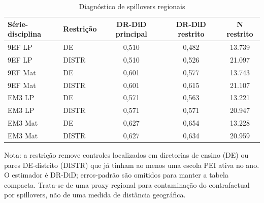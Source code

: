 \begin{table}[htbp]
\centering
\caption{Diagnóstico de spillovers regionais}
\label{tab:spillover_regional}
\begin{tabular}{llccc}
\toprule
Série-disciplina & Restrição & DR-DiD principal & DR-DiD restrito & N restrito \\
\midrule
9EF LP & DE & 0,510 & 0,482 & 13.739 \\
9EF LP & DISTR & 0,510 & 0,526 & 21.097 \\
9EF Mat & DE & 0,601 & 0,577 & 13.743 \\
9EF Mat & DISTR & 0,601 & 0,615 & 21.107 \\
EM3 LP & DE & 0,571 & 0,563 & 13.221 \\
EM3 LP & DISTR & 0,571 & 0,571 & 20.947 \\
EM3 Mat & DE & 0,627 & 0,654 & 13.228 \\
EM3 Mat & DISTR & 0,627 & 0,634 & 20.959 \\
\bottomrule
\end{tabular}
\vspace{0.2cm}
\begin{flushleft}
\footnotesize Nota: a restrição remove controles localizados em diretorias de ensino (DE) ou pares DE-distrito (DISTR) que já tinham ao menos uma escola PEI ativa no ano. O estimador é DR-DiD; erros-padrão são omitidos para manter a tabela compacta. Trata-se de uma proxy regional para contaminação do contrafactual por spillovers, não de uma medida de distância geográfica.
\end{flushleft}
\end{table}
